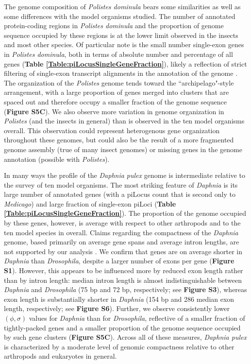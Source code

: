 The genome composition of \textit{Polistes dominula} bears some similarities as well as some differences with the model organisms studied.
The number of annotated protein-coding regions in \textit{Polistes dominula} and the proportion of genome sequence occupied by these regions is at the lower limit observed in the insects and most other species.
Of particular note is the small number single-exon genes in \textit{Polistes dominula}, both in terms of absolute number and percentage of all genes (\textbf{Table \ref{Table:piLocusSingleGeneFraction}}), likely a reflection of strict filtering of single-exon transcript alignments in the annotation of the genome \cite{PdomGenome}.
The organization of the \textit{Polistes} genome tends toward the ``archipelago"-style arrangement, with a large proportion of genes merged into clusters that are spaced out and therefore occupy a smaller fraction of the genome sequence (\textbf{Figure S5C}).
We also observe more variation in genome organization in \textit{Polistes} (and the insects in general) than is observed in the ten model organisms overall.
This observation could represent heterogenous gene organization throughout these genomes, but could also be the result of a more fragmented genome assembly (true of many insect genomes) or missing genes in the genome annotation (possible with \textit{Polistes}).

In many ways the profile of the \textit{Daphnia pulex} genome is intermediate relative to the survey of ten model organisms.
The most striking feature of \textit{Daphnia} is its large number of annotated genes (with a piLocus count that is second only to \textit{Medicago}) and large fraction of single-exon piLoci (\textbf{Table \ref{Table:piLocusSingleGeneFraction}}).
The proportion of the genome occupied by these genes, however, is average with respect to other arthropods and to the ten model species in overall.
Claims regarding the compactness of the \textit{Daphnia} genome, based primarily on average gene spans and average intron lengths, are not supported by our analysis \cite{DaphniaGenome}.
We confirm that genes are on average shorter in \textit{Daphnia} than \textit{Drosophila}, despite a larger number of exons per gene (\textbf{Figure S1}).
However, this appears to be influenced more by reduced exon length rather than by intron length: median intron length is almost indistinguishable between \textit{Daphnia} and \textit{Drosophila} (75 bp and 72 bp, respectively; see \textbf{Figure S3}), whereas exon length is substantially shorter in \textit{Daphnia} (154 bp and 286 median exon length, respectively; see \textbf{Figure S6}).
Further, we observe consistently lower $(\phi, \sigma)$ values for \textit{Daphnia} than for \textit{Drosophila}, reflective of a smaller fraction of tightly-packed genes and a smaller proportion of the genome sequence occupied by such gene clusters (\textbf{Figure S5C}).
Across all of these measures, \textit{Daphnia pulex} is characterized by a moderate level of genomic compactness relative to other arthropods and eukaryotes in general.

